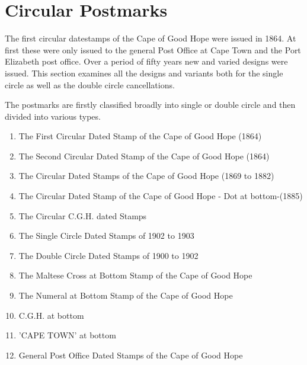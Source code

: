 \chapter{Circular Postmarks}




The first circular datestamps of the Cape of Good Hope were issued in 1864. 
At first these were only issued to the general Post Office at Cape Town and 
the Port Elizabeth post office. Over a period of fifty years new and varied 
designs were issued. This section examines all the designs and variants 
both for the single circle as well as the double circle cancellations.

The postmarks are firstly classified broadly into single or double circle 
and then divided into various types.


\begin{enumerate}
\item The First Circular Dated Stamp of the Cape of Good Hope (1864)

\item The Second Circular Dated Stamp of the Cape of Good Hope (1864)

\item  The Circular Dated Stamps of the Cape of Good Hope (1869 to 1882)

\item The Circular Dated Stamp of the Cape of Good Hope - Dot at bottom-(1885)

\item  The Circular C.G.H. dated Stamps

\item      The Single Circle Dated Stamps of 1902 to 1903

\item  The Double Circle Dated Stamps of 1900 to 1902

\item  The Maltese Cross at Bottom Stamp of the Cape of Good Hope
 
\item  The Numeral at Bottom Stamp of the Cape of Good Hope

\item C.G.H. at bottom 

\item  'CAPE TOWN' at bottom

\item  General Post Office Dated Stamps of the Cape of Good Hope

\end{enumerate}

